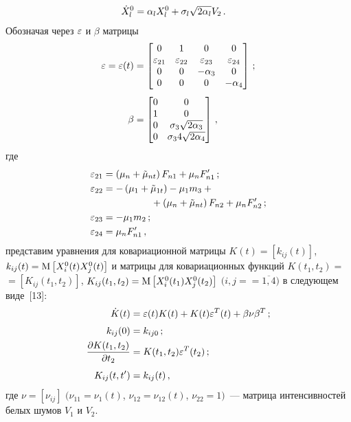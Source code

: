 \begin{multicols}{2}
\begin{align*}
\dot X_l^0 &=\alpha_l X_l^0 +\sigma_l \sqrt{2\alpha_l} V_2\,.
\end{align*}
Обозначая через $\varepsilon$ и $\beta$ матрицы
\begin{align}
 \varepsilon = \varepsilon(t) &=
\begin{bmatrix}
 0&1&0&0\\
 \varepsilon_{21}&\varepsilon_{22}&\varepsilon_{23}&\varepsilon_{24}\\
 0&0&-\alpha_3&0\\
 0&0&0&-\alpha_4
\end{bmatrix}\,;\notag\\[-6pt]
&\label{e13}\\[-6pt]
 \beta &=\begin{bmatrix}
 0&0\\
 1&0\\
 0&\sigma_3\sqrt{2\alpha_3}\\
 0&\sigma_34\sqrt{2\alpha_4}
\end{bmatrix}\,,\notag
\end{align}
где
\begin{align}
 \varepsilon_{21} &= \left(\mu_n +\tilde\mu_{nt}\right) F_{n1} +\mu_n F_{n1}'\,;\notag \\
 \varepsilon_{22} &= -\left(\mu_1 +\tilde\mu_{1t}\right)-\mu_1 m_3+{}\notag \\
 &\hspace*{50pt}{}+ \left(\mu_n +\tilde\mu_{nt}\right) F_{n2} +\mu_n F_{n2}'\,; \label{e14}\\
 \varepsilon_{23} &=-\mu_1m_2\,;\notag\\
 \varepsilon_{24} &= \mu_n F_{n1}'\,,\notag
\end{align}
представим уравнения для ковариационной матрицы $K(t)=\left[ k_{ij}(t)\right]$, 
$k_{ij}(t) ={\rm M} \left[ X_i^0 (t) X_j^0 (t)\right]$ и мат\-ри\-цы для 
ковариационных функций $K(t_1, t_2) = $\linebreak $=\left[ K_{ij} (t_1, 
t_2)\right]$, $ K_{ij} (t_1, t_2) ={\rm M} \left[ X_i^0 (t_1) X_j^0 (t_2)\right]$ 
$(i,j=$\linebreak $=\overline{1,4})$ в следующем виде~[13]:
\begin{align}
\dot K(t) &= \varepsilon (t) K(t) + K(t) \varepsilon^T(t) +\beta \nu \beta^T\,;\notag\\[-6pt]
  \label{e15}\\[-6pt]
 k_{ij} (0) &= k_{ij0}\,;\notag\\
 \displaystyle\frac{\displaystyle \partial K(t_1, t_2)\mathstrut}{\displaystyle \partial t_2\mathstrut} &= K(t_1, t_2) \varepsilon^T(t_2)\,;\notag\\[-6pt]
  \label{e16}\\[-6pt]
 K_{ij} (t, t') &= k_{ij} (t)\,,\notag
\end{align}
где $\nu =\left[ \nu_{ij}\right]$ $( \nu_{11} = \nu_1 (t)$, $\nu_{12} =\nu_{12} 
(t)$, $ \nu_{22}=1)$~--- матрица интенсивностей белых шумов $V_1$ и $V_2$.


\end{multicols}
